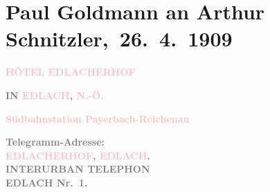 

\renewcommand{\erwaehntePersonen}{Personen: Eva Marie Goldmann, Rudolf Lothar, Olga Schnitzler, Lili Schnitzler, Heinrich Schnitzler}
\renewcommand{\erwaehnteInstitutionen}{Institutionen: k. k. Post- und Telegraphenverwaltung}
\renewcommand{\erwaehnteOrte}{Orte: Bahnhof Payerbach-Reichenau, Berlin, Deutsches Theater Berlin, Edlach, Hotel Edlacherhof, Niederösterreich, Semmering, Wien}
\renewcommand{\erwaehnteWerke}{Werke: Faust bei Reinhardt, Pester Lloyd}
\section[ Paul Goldmann an Arthur Schnitzler, 26. 4. 1909]{Paul Goldmann an Arthur Schnitzler, 26. 4. 1909}
\nopagebreak{}
\rehead{ }\normalsize\beginnumbering{}
\toendnotes[C]{\smallbreak\pagebreak[2]}
\toendnotes[C]{\smallbreak}
\pstart
           \noindent{}{\pb}\textcolor{gray}{\textbf{\textcolor{pink}{HÔTEL EDLACHERHOF}{}\ledrightnote{\textcolor{pink}{Hotel Edlacherhof}}}}\pend
           
\pstart
           \raggedleft{}\textcolor{gray}{\textbf{IN \textcolor{pink}{EDLACH}{}\ledrightnote{\textcolor{pink}{Edlach}}, \textcolor{pink}{N.-Ö.}{}\ledrightnote{\textcolor{pink}{Niederösterreich}}}}\pend
           
\pstart
           \noindent{}\raggedleft{}\textcolor{gray}{\textbf{\textbf{\textcolor{pink}{Südbahnstation Payerbach-Reichenau}{}\ledrightnote{\textcolor{pink}{Bahnhof Payerbach-Reichenau}}}}}\pend
           
\pstart
           \noindent{}\textcolor{gray}{\textbf{Telegramm-Adresse:}}{\\}\textcolor{gray}{\textbf{\textbf{\textcolor{pink}{EDLACHERHOF}{}\ledrightnote{\textcolor{pink}{Hotel Edlacherhof}}, \textcolor{pink}{EDLACH}{}\ledrightnote{\textcolor{pink}{Edlach}}.}}}{\\}\textcolor{gray}{\textbf{INTERURBAN TELEPHON}}{\\}\textcolor{gray}{\textbf{\textbf{EDLACH Nr. 1.}}}\pend
           
